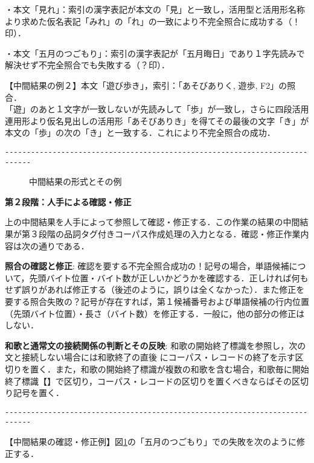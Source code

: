 \noindent
・本文「見れ」：索引の漢字表記が本文の「見」と一致し，活用型と活用形名称より求めた仮名表記「みれ」の「れ」の一致により不完全照合に成功する（！印）．

\noindent
・本文「五月のつごもり」：索引の漢字表記が「五月晦日」であり１字先読みで解決せず不完全照合でも失敗する（？印）．

\noindent
【中間結果の例２】本文「遊び歩き」，索引：「あそびありく, 遊歩, F2」の照合．
\\「遊」のあと１文字が一致しないが先読みして「歩」が一致し，さらに四段活用連用形より仮名見出しの活用形「あそびありき」を得てその最後の文字「き」が本文の「歩」の次の「き」と一致する．これにより不完全照合の成功．
\begin{verbatim}
----------------------------------------------------------------------------
\end{verbatim}

\begin{figure}[tb]
\begin{center}
\end{center}
\caption{中間結果の形式とその例}

\label{CheckF}
\end{figure}


\noindent
{\bf 第２段階：人手による確認・修正}

上の中間結果を人手によって参照して確認・修正する．この作業の結果の中間結果が第３段階の品詞タグ付きコーパス作成処理の入力となる．確認・修正作業内容は次の通りである．

\noindent
{\bf 照合の確認と修正}:
確認を要する不完全照合成功の！記号の場合，単語候補について，先頭バイト位置・バイト数が正しいかどうかを確認する．正しければ何もせず誤りがあれば修正する（後述のように，誤りは全くなかった）．また修正を要する照合失敗の？記号が存在すれば，第１候補番号および単語候補の行内位置（先頭バイト位置）・長さ（バイト数）を修正する．一般に，他の部分の修正はしない．

\noindent
{\bf 和歌と通常文の接続関係の判断とその反映}:
和歌の開始終了標識を参照し，次の文と接続しない場合には和歌終了の直後
にコーパス・レコードの終了を示す区切りを置く．また，和歌の開始終了標識が複数の和歌を含む場合，和歌毎に開始終了標識【】で区切り，コーパス・レコードの区切りを置くべきならばその区切り記号を置く．

\begin{verbatim}
----------------------------------------------------------------------------
\end{verbatim}
【中間結果の確認・修正例】図\ref{CheckF}の「五月のつごもり」での失敗を次のように修正する．


